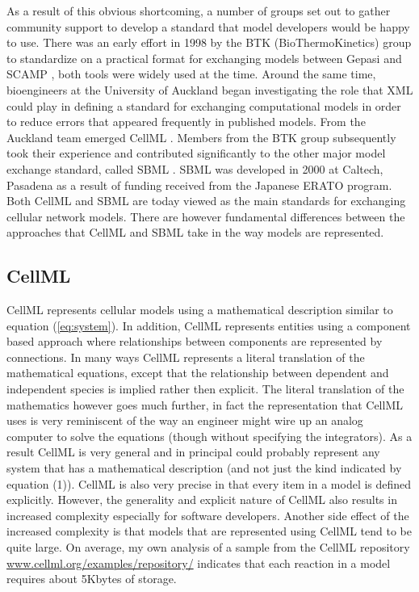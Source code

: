 \documentclass[12pt]{article}
\begin{document}
As a result of this obvious shortcoming, a number of groups set
out to gather community support to develop a standard that model
developers would be happy to use.  There was an early effort in
1998 by the BTK (BioThermoKinetics) group to standardize on a
practical format for exchanging models between Gepasi
\cite{Gepasi:1993} and SCAMP \cite{SauroF91}, both tools were
widely used at the time. Around the same time, bioengineers at the
University of Auckland began investigating the role that XML \cite{harold:2001} could
play in defining a standard for exchanging computational models in
order to reduce errors that appeared frequently in published
models. From the Auckland team emerged CellML
\cite{LloydCellML2004}. Members from the BTK group subsequently
took their experience and contributed significantly to the other
major model exchange standard, called SBML \cite{hucka:2002d}.
SBML was developed in 2000 at Caltech, Pasadena as a result of
funding received from the Japanese ERATO program. Both CellML and
SBML are today viewed as the main standards for exchanging
cellular network models. There are however fundamental differences
between the approaches that CellML and SBML take in the way models
are represented.


\subsection{CellML}

CellML \cite{LloydCellML2004} represents cellular models using a
mathematical description similar to equation (\ref{eq:system}). In
addition, CellML represents entities using a component based
approach where relationships between components are represented by
connections. In many ways CellML represents a literal translation
of the mathematical equations, except that the relationship
between dependent and independent species is implied rather then
explicit. The literal translation of the mathematics however goes
much further, in fact the representation that CellML uses is very
reminiscent of the way an engineer might wire up an analog
computer to solve the equations (though without specifying the integrators). As a result CellML is very general and in principal could probably represent any system that
has a mathematical description (and not just the kind indicated by equation (1)). CellML is also very precise in that every item in a model is defined explicitly. However, the
generality and explicit nature of CellML also results in
increased complexity especially for software developers. Another
side effect of the increased complexity is that models that are
represented using CellML tend to be quite large. On average, my
own analysis of a sample from the CellML repository \url{www.cellml.org/examples/repository/}
indicates that each reaction in a model requires about 5Kbytes of
storage.
\end{document}
